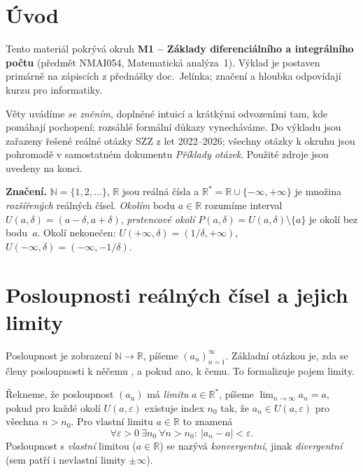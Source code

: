 \documentclass[11pt,a4paper]{article}
\begin{document}
\maketitle
\tableofcontents
\bigskip

\section*{Úvod}

Tento materiál pokrývá okruh \textbf{M1 -- Základy diferenciálního a integrálního počtu} (předmět NMAI054, Matematická analýza~1). Výklad je postaven primárně na zápiscích z přednášky doc.~Jelínka; značení a hloubka odpovídají kurzu pro informatiky.

Věty uvádíme \emph{se zněním}, doplněné intuicí a krátkými odvozeními tam, kde pomáhají pochopení; rozsáhlé formální důkazy vynecháváme. Do výkladu jsou zařazeny řešené reálné otázky SZZ z let 2022--2026; všechny otázky k okruhu jsou pohromadě v samostatném dokumentu \emph{Příklady otázek}. Použité zdroje jsou uvedeny na konci.

\medskip
\noindent\textbf{Značení.} $\mathbb{N}=\{1,2,\dots\}$, $\mathbb{R}$ jsou reálná čísla a $\mathbb{R}^*=\mathbb{R}\cup\{-\infty,+\infty\}$ je množina \emph{rozšířených} reálných čísel. \emph{Okolím} bodu $a\in\mathbb{R}$ rozumíme interval $U(a,\delta)=(a-\delta,a+\delta)$, \emph{prstencové okolí} $P(a,\delta)=U(a,\delta)\setminus\{a\}$ je okolí bez bodu~$a$. Okolí nekonečen: $U(+\infty,\delta)=(1/\delta,+\infty)$, $U(-\infty,\delta)=(-\infty,-1/\delta)$.

\section{Posloupnosti reálných čísel a jejich limity}

Posloupnost je zobrazení $\mathbb{N}\to\mathbb{R}$, píšeme $(a_n)_{n=1}^\infty$. Základní otázkou je, zda se členy posloupnosti k něčemu , a pokud ano, k čemu. To formalizuje pojem limity.

\begin{definice}
Řekneme, že posloupnost $(a_n)$ má \emph{limitu} $a\in\mathbb{R}^*$, píšeme $\lim_{n\to\infty}a_n=a$, pokud pro každé okolí $U(a,\varepsilon)$ existuje index $n_0$ tak, že $a_n\in U(a,\varepsilon)$ pro všechna $n>n_0$. Pro vlastní limitu $a\in\mathbb{R}$ to znamená
\[
  \forall\varepsilon>0\ \exists n_0\ \forall n>n_0:\ |a_n-a|<\varepsilon.
\]
Posloupnost s \emph{vlastní} limitou ($a\in\mathbb{R}$) se nazývá \emph{konvergentní}, jinak \emph{divergentní} (sem patří i nevlastní limity $\pm\infty$).
\end{definice}
\end{document}
